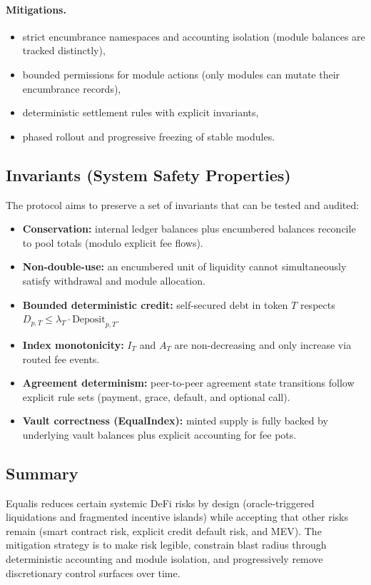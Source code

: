 \documentclass[version=preprint]{iacrcc}
\begin{document}
\paragraph{Mitigations.}
\begin{itemize}
  \item strict encumbrance namespaces and accounting isolation (module balances are tracked distinctly),
  \item bounded permissions for module actions (only modules can mutate their encumbrance records),
  \item deterministic settlement rules with explicit invariants,
  \item phased rollout and progressive freezing of stable modules.
\end{itemize}

\subsection{Invariants (System Safety Properties)}

The protocol aims to preserve a set of invariants that can be tested and audited:
\begin{itemize}
  \item \textbf{Conservation:} internal ledger balances plus encumbered balances reconcile to pool totals (modulo explicit fee flows).
  \item \textbf{Non-double-use:} an encumbered unit of liquidity cannot simultaneously satisfy withdrawal and module allocation.
  \item \textbf{Bounded deterministic credit:} self-secured debt in token $T$ respects $D_{p,T} \le \lambda_T \cdot \text{Deposit}_{p,T}$.
  \item \textbf{Index monotonicity:} $I_T$ and $A_T$ are non-decreasing and only increase via routed fee events.
  \item \textbf{Agreement determinism:} peer-to-peer agreement state transitions follow explicit rule sets (payment, grace, default, and optional call).
  \item \textbf{Vault correctness (EqualIndex):} minted supply is fully backed by underlying vault balances plus explicit accounting for fee pots.
\end{itemize}

\subsection{Summary}

Equalis reduces certain systemic DeFi risks by design (oracle-triggered liquidations and fragmented incentive islands) while accepting that other risks remain (smart contract risk, explicit credit default risk, and MEV). The mitigation strategy is to make risk legible, constrain blast radius through deterministic accounting and module isolation, and progressively remove discretionary control surfaces over time.
\end{document}
